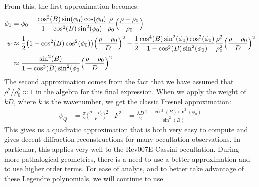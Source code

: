 \documentclass[crop=false,class=book,oneside]{standalone}
\begin{document}
            From this, the first approximation becomes:
            \begin{align*}
                \phi_{1}
                &=\phi_{0}-
                \frac{\cos^{2}(B)\sin(\phi_{0})\cos(\phi_{0})}
                     {1-\cos^{2}(B)\sin^{2}(\phi_{0})}
                \frac{\rho}{\rho_{0}}
                \Big(\frac{\rho-\rho_{0}}{\rho_{0}}\Big)\\
                \psi
                &\approx
                    \frac{1}{2}\big(
                        1-\cos^{2}(B)\cos^{2}(\phi_{0})
                    \big)
                    \Big(\frac{\rho-\rho_{0}}{D}\Big)^{2}
                    -
                    \frac{1}{2}
                    \frac{%
                        \cos^{4}(B)\sin^{2}(\phi_{0})
                        \cos^{2}(\phi_{0})
                    }{
                    1-\cos^{2}(B)\sin^{2}(\phi_{0})}
                    \frac{\rho^{2}}{\rho_{0}^{2}}
                \Big(\frac{\rho-\rho_{0}}{D}\Big)^{2}\\
                &\approx
                \frac{\sin^{2}(B)}
                     {1-\cos^{2}(B)\sin^{2}(\phi_{0}}
                \Big(\frac{\rho-\rho_{0}}{D}\Big)^{2}
            \end{align*}
            The second approximation comes from the fact
            that we have assumed that
            $\rho^{2}/\rho_{0}^{2}\approx{1}$
            in the algebra for this final expression. When
            we apply the weight of $kD$, where $k$ is the
            wavenumber, we get the classic Fresnel
            approximation:
            \begin{align*}
                \psi_{Q}&=\frac{\pi}{2}
                \Big(\frac{\rho-\rho_{0}}{F}\Big)^{2}
                &
                F^{2}&=
                \frac{\lambda{D}}{2}
                    \frac{1-\cos^{2}(B)\sin^{2}(\phi_{0})}
                         {\sin^{2}(B)}
            \end{align*}
            This gives us a quadratic approximation that is
            both very easy to compute and gives decent
            diffraction reconstructions for many 
            occultation observations. In particular,
            this applies very well to the
            Rev007E Cassini occultation. During more
            pathalogical geometries, there is a need to use
            a better approximation and to use
            higher order terms. For ease of analyis, and
            to better take advantage of these Legendre
            polynomials, we will continue to use
\end{document}
